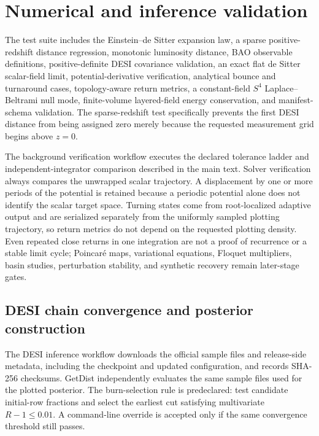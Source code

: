 \section{Numerical and inference validation}
\label{app:numerical-validation}

The test suite includes the Einstein--de Sitter expansion law, a sparse positive-redshift distance regression, monotonic luminosity distance, BAO observable definitions, positive-definite DESI covariance validation, an exact flat de Sitter scalar-field limit, potential-derivative verification, analytical bounce and turnaround cases, topology-aware return metrics, a constant-field $S^4$ Laplace--Beltrami null mode, finite-volume layered-field energy conservation, and manifest-schema validation. The sparse-redshift test specifically prevents the first DESI distance from being assigned zero merely because the requested measurement grid begins above $z=0$.

The background verification workflow executes the declared tolerance ladder and independent-integrator comparison described in the main text. Solver verification always compares the unwrapped scalar trajectory. A displacement by one or more periods of the potential is retained because a periodic potential alone does not identify the scalar target space. Turning states come from root-localized adaptive output and are serialized separately from the uniformly sampled plotting trajectory, so return metrics do not depend on the requested plotting density. Even repeated close returns in one integration are not a proof of recurrence or a stable limit cycle; Poincar\'e maps, variational equations, Floquet multipliers, basin studies, perturbation stability, and synthetic recovery remain later-stage gates.

\subsection{DESI chain convergence and posterior construction}
The DESI inference workflow downloads the official sample files and release-side metadata, including the checkpoint and updated configuration, and records SHA-256 checksums. GetDist independently evaluates the same sample files used for the plotted posterior. The burn-selection rule is predeclared: test candidate initial-row fractions and select the earliest cut satisfying multivariate $R-1\le0.01$. A command-line override is accepted only if the same convergence threshold still passes.


